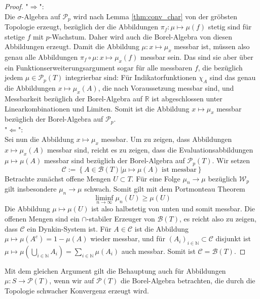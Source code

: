 \begin{proof}
"$\Rightarrow$": \\
Die $\sigma$-Algebra auf $\mathcal{P}_p$ wird nach Lemma \ref{thm:conv_char} von der gröbsten Topologie erzeugt, bezüglich der die Abbildungen $\pi_f: \mu \mapsto \mu(f)$ stetig sind für stetige $f$ mit $p$-Wachstum. Daher wird auch die Borel-Algebra von diesen Abbildungen erzeugt. Damit die Abbildung $\mu: x\mapsto \mu_x$ messbar ist, müssen also genau alle Abbildungen $\pi_f \circ \mu: x\mapsto \mu_x(f)$ messbar sein. Das sind sie aber über ein Funktionserweiterungsargument sogar für alle messbaren $f$, die bezüglich jedem $\mu \in \mathcal{P}_p(T)$ integrierbar sind: Für Indikatorfunktionen $\chi_A$ sind das genau die Abbildungen $x\mapsto \mu_x(A)$, die nach Voraussetzung messbar sind, und Messbarkeit bezüglich der Borel-Algebra auf $\mathbb{R}$ ist abgeschlossen unter Linearkombinationen und Limiten. Somit ist die Abbildung $x \mapsto \mu_x$ messbar bezüglich der Borel-Algebra auf $\mathcal{P}_p$. \\
"$\Leftarrow$": \\
Sei nun die Abbildung $x \mapsto \mu_x$ messbar. Um zu zeigen, dass Abbildungen $x\mapsto \mu_x(A)$ messbar sind, reicht es zu zeigen, dass die Evaluationsabbildungen $\mu \mapsto \mu(A)$ messbar sind bezüglich der Borel-Algebra auf $\mathcal{P}_p(T)$. Wir setzen
$$\mathcal{C}:=\left\{A \in \mathcal{B}(T) \vert \mu \mapsto \mu(A) \text{ ist messbar}\right\}$$
Betrachte zunächst offene Mengen $U\subset T$. Für eine Folge $\mu_n \rightarrow \mu$ bezüglich $\mathcal{W}_p$ gilt insbesondere $\mu_n\rightarrow \mu$ schwach. Somit gilt mit dem Portmonteau Theorem
$$\liminf_{n\rightarrow\infty}\mu_n(U) \geq \mu(U)$$
Die Abbildung $\mu \mapsto \mu(U)$ ist also halbstetig von unten und somit messbar. Die offenen Mengen sind ein $\cap$-stabiler Erzeuger von $\mathcal{B}(T)$, es reicht also zu zeigen, dass $\mathcal{C}$ ein Dynkin-System ist. Für $A\in\mathcal{C}$ ist die Abbildung $\mu \mapsto \mu(A^c)=1-\mu(A)$ wieder messbar, und für $(A_i)_{i\in\mathbb{N}}\subset \mathcal{C}$ disjunkt ist 
$\mu\mapsto \mu(\bigcup_{i\in\mathbb{N}}A_i)=\sum_{i\in\mathbb{N}}\mu(A_i)$ auch messbar. Somit ist $\mathcal{C}=\mathcal{B}(T)$.
\end{proof}
\begin{remark}\label{rem:kernel_char_no_p}
Mit dem gleichen Argument gilt die Behauptung auch für Abbildungen $\mu: S \rightarrow \mathcal{P}(T)$, wenn wir auf $\mathcal{P}(T)$ die Borel-Algebra betrachten, die durch die Topologie schwacher Konvergenz erzeugt wird.
\end{remark}
